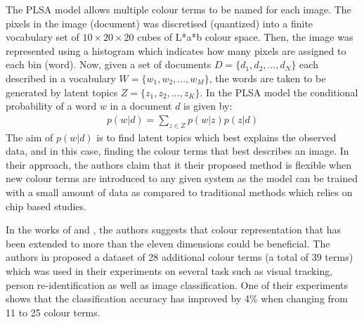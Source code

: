 The PLSA model allows multiple colour terms to be named for each image. The
pixels in the image (document) was discretised (quantized) into a finite
vocabulary set of $10 \times 20 \times 20$ cubes of L*a*b colour space. Then,
the image was represented using a histogram which indicates how many pixels are
assigned to each bin (word). Now, given a set of documents $D = \{d_1, d_2, ...
, d_N\}$ each described in a vocabulary $W = \{w_1, w_2, ... , w_M\}$, the words
are taken to be generated by latent topics $Z = \{z_1, z_2, ... , z_K\}$. In the
PLSA model the conditional probability of a word $w$ in a document $d$ is given
by: \begin{align} p(w|d) = \sum_{z\in Z}{p(w|z)p(z|d)} \end{align} The aim of
$p(w|d)$ is to find latent topics which best explains the observed data, and
in this case, finding the colour terms that best describes an image. In their
approach, the authors claim that it their proposed method is flexible when new
colour terms are introduced to any given system as the model can be trained
with a small amount of data as compared to traditional methods which relies on
chip based studies.

In the works of  and , the
authors suggests that colour representation that has been extended to more than
the eleven dimensions could be beneficial. The authors in \cite{yu2018beyond}
proposed a dataset of 28 additional colour terms (a total of 39 terms) which was
used in their experiments on several task such as visual tracking, person
re-identification as well as image classification. One of their experiments
shows that the classification accuracy has improved by 4\% when changing from 11
to 25 colour terms.



